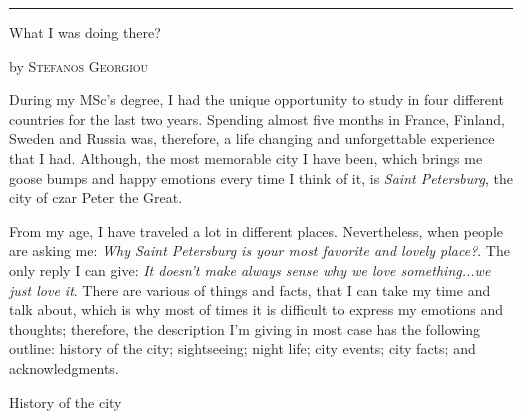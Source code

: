 \documentclass[10pt,a4paper]{article} %
\newcommand{\SepRule}{\noindent	%
\begin{center}
\rule{250pt}{1pt} %
\end{center}
}
\newcommand{\NewsItem}[1]{ %
\usefont{T1}{fvs}{n}{n} %
\vspace{24pt}\large #1\vspace{3pt} %
\par \normalsize \normalfont}
\newcommand{\NewsAuthor}[1]{ %
\hfill by \textsc{#1} \vspace{20pt} %
\par \normalfont}
\begin{document}
\vspace{0.5cm}
\SepRule %
\vspace{0.5cm}

\begin{multicols}{3} %


\NewsItem{What I was doing there?}
\NewsAuthor{Stefanos Georgiou}

During my MSc's degree, I had the unique opportunity to study 
in four different countries for the last two years. 
Spending almost five months in France, Finland, Sweden and Russia was, 
therefore, a life changing and unforgettable experience that I had. 
Although, the most memorable city I have been, 
which brings me goose bumps and happy emotions every time I think of it, 
is \textit{Saint Petersburg}, the city of czar Peter the Great.

From my age, I have traveled a lot in different places. 
Nevertheless, when people are asking me: 
\textit{Why Saint Petersburg is your most favorite and lovely place?}. 
The only reply I can give: \textit{It doesn't make always sense why we love something...we just love it}. 
There are various of things and facts, that I can take my time and talk about, 
which is why most of times it is difficult to express my emotions and thoughts; 
therefore, the description I'm giving in most case has the following outline:
history of the city; sightseeing; night life; city events; city facts; 
and acknowledgments.

\NewsItem{History of the city}


\end{multicols}
\end{document}

